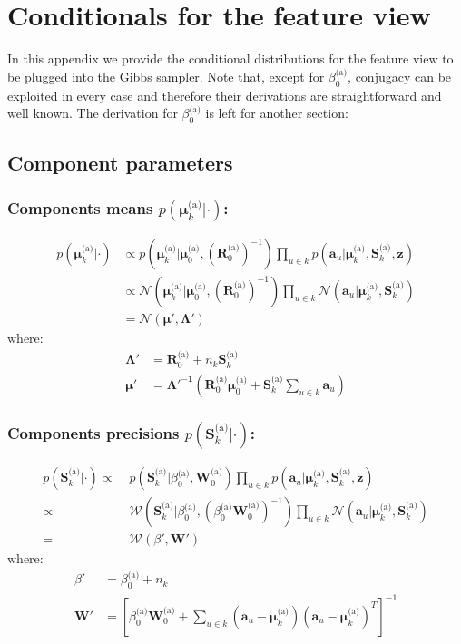 \documentclass[smallextended]{svjour3}          %
\newcommand{\Muo}{\boldsymbol{\mu}_{0}^\text{(a)}}
\newcommand{\Ro}{\mathbf{R}_{0}^\text{(a)}}
\newcommand{\invRo}{\left(\mathbf{R}_{0}^\text{(a)}\right)^{-1}}
\newcommand{\Wo}{\mathbf{W}_{0}^\text{(a)}}
\newcommand{\betaoa}{\beta_{0}^\text{(a)}}
\newcommand{\Muk}{\boldsymbol{\mu}_{k}^\text{(a)}}
\newcommand{\Sk}{\mathbf{S}_{k}^\text{(a)}}
\begin{document}
\section{Conditionals for the feature view}
In this appendix we provide the conditional distributions for the feature view to be plugged into the Gibbs sampler. Note that, except for $\betaoa$, conjugacy can be exploited in every case and therefore their derivations are straightforward and well known. The derivation for $\betaoa$ is left for another section:
\subsection{Component parameters}
\subsubsection*{Components means $p(\Muk | \cdot )$:}
\begin{align*}
p(\Muk | \cdot ) 
&\propto
p\left(\Muk | \Muo, \invRo\right) 
\prod_{u \in k} p\left(\mathbf{a}_u | \Muk, \Sk, \mathbf{z}\right)\\
&\propto
\mathcal{N}\left(\Muk | \Muo, \invRo\right) 
\prod_{u \in k} \mathcal{N}\left(\mathbf{a}_u | \Muk, \Sk\right)\\
&=
\mathcal{N}(\boldsymbol{\mu', \Lambda'})
\end{align*}
where:
\begin{align*}
\boldsymbol{\Lambda'} &= \Ro + n_k \Sk\\ 
\boldsymbol{\mu'} &= \boldsymbol{\Lambda'^{-1}} \left(\Ro \Muo + \Sk \sum_{u\in k} \mathbf{a}_u\right)
\end{align*}

\subsubsection*{Components precisions $p(\Sk | \cdot )$:}
\begin{align*}
p(\Sk | \cdot ) 
\propto\;& 
p\left(\Sk |\betaoa, \Wo\right)
\prod_{u \in k} p\left(\mathbf{a}_u | \Muk, \Sk, \mathbf{z}\right)\\
\propto\;&
\mathcal{W}\left(\Sk |\betaoa, (\betaoa
\Wo)^{-1}\right)%
\prod_{u \in k} \mathcal{N}\left(\mathbf{a}_u | \Muk, \Sk\right)\\
=\;& \mathcal{W}(\beta', \mathbf{W}')
\end{align*}
where:
\begin{align*}
\beta' &= \betaoa + n_k\\
\mathbf{W}' &= 
\left[ \betaoa\Wo + \sum_{u \in k} (\mathbf{a}_u - \Muk)(\mathbf{a}_u- \Muk)^T  \right]^{-1}
\end{align*}
\end{document}
